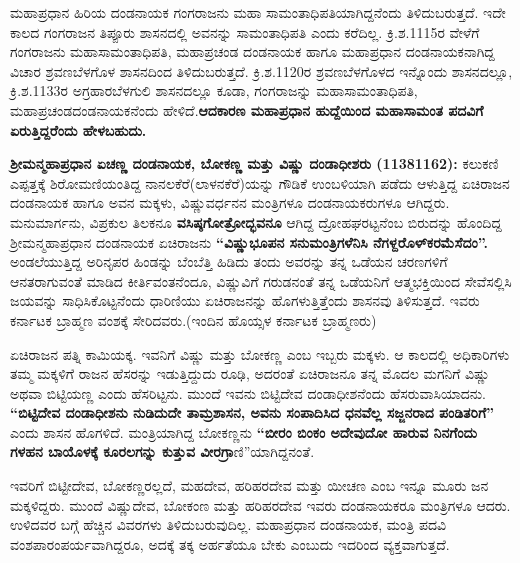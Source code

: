ಮಹಾಪ್ರಧಾನ ಹಿರಿಯ ದಂಡನಾಯಕ ಗಂಗರಾಜನು ಮಹಾ ಸಾಮಂತಾಧಿಪತಿಯಾಗಿದ್ದನೆಂದು ತಿಳಿದುಬರುತ್ತದೆ. ಇದೇ ಕಾಲದ ಗಂಗರಾಜನ ತಿಪ್ಪೂರು ಶಾಸನದಲ್ಲಿ ಅವನನ್ನು ಸಾಮಂತಾಧಿಪತಿ ಎಂದು ಕರೆದಿಲ್ಲ. ಕ್ರಿ.ಶ.1115ರ ವೇಳೆಗೆ ಗಂಗರಾಜನು ಮಹಾಸಾಮಂತಾಧಿಪತಿ, ಮಹಾಪ್ರಚಂಡ ದಂಡನಾಯಕ ಹಾಗೂ ಮಹಾಪ್ರಧಾನ ದಂಡನಾಯಕನಾಗಿದ್ದ ವಿಚಾರ ಶ್ರವಣಬೆಳಗೊಳ ಶಾಸನದಿಂದ ತಿಳಿದುಬರುತ್ತದೆ. ಕ್ರಿ.ಶ.1120ರ ಶ್ರವಣಬೆಳಗೊಳದ ಇನ್ನೊಂದು ಶಾಸನದಲ್ಲೂ, ಕ್ರಿ.ಶ.1133ರ ಅಗ್ರಹಾರಬೆಳಗುಲಿ ಶಾಸನದಲ್ಲೂ ಕೂಡಾ, ಗಂಗರಾಜನ್ನು ಮಹಾಸಾಮಂತಾಧಿಪತಿ, ಮಹಾಪ್ರಚಂಡ\break ದಂಡನಾಯಕನೆಂದು ಹೇಳಿದೆ.\textbf{ಆದಕಾರಣ ಮಹಾಪ್ರಧಾನ ಹುದ್ದೆಯಿಂದ ಮಹಾಸಾಮಂತ ಪದವಿಗೆ ಏರುತ್ತಿದ್ದರೆಂದು ಹೇಳಬಹುದು.}

\textbf{ಶ‍್ರೀಮನ್ಮಹಾಪ್ರಧಾನ ಏಚಣ್ಣ ದಂಡನಾಯಕ, ಬೋಕಣ್ಣ ಮತ್ತು ವಿಷ್ಣು ದಂಡಾಧೀಶರು (1138\general{\enginline{-}}1162):} ಕಲುಕಣಿ ಎಪ್ಪತ್ತಕ್ಕೆ ಶಿರೋಮಣಿಯಂತಿದ್ದ ನಾನಲಕೆರೆ(ಲಾಳನಕೆರೆ)ಯನ್ನು ಗೌಡಿಕೆ ಉಂಬಳಿಯಾಗಿ ಪಡೆದು ಆಳುತ್ತಿದ್ದ ಏಚಿರಾಜನ ದಂಡನಾಯಕ ಹಾಗೂ ಅವನ ಮಕ್ಕಳು, ವಿಷ್ಣುವರ್ಧನನ ಮಂತ್ರಿಗಳೂ ದಂಡನಾಯಕರುಗಳೂ ಆಗಿದ್ದರು. ಮನುಮಾರ್ಗನು, ವಿಪ್ರಕುಲ ತಿಲಕನೂ \textbf{ವಸಿಷ್ಠಗೋತ್ರೋದ್ಭವನೂ} ಆಗಿದ್ದ ದ್ರೋಹಘರಟ್ಟನೆಂಬ ಬಿರುದನ್ನು ಹೊಂದಿದ್ದ ಶ‍್ರೀಮನ್ಮಹಾಪ್ರಧಾನ ದಂಡನಾಯಕ ಏಚಿರಾಜನು \textbf{“ವಿಷ್ಣುಭೂಪನ ಸನುಮಂತ್ರಿಗಳೆನಿಸಿ ನೆಗಳ್ದರೊಳ್​ ಕರಮೆಸೆದಂ”. } ಅಂಡಲೆಯುತ್ತಿದ್ದ ಅರಿನೃಪರ ಹಿಂಡನ್ನು ಬೆಂಬೆತ್ತಿ ಹಿಡಿದು ತಂದು ಅವರನ್ನು ತನ್ನ ಒಡೆಯನ ಚರಣಗಳಿಗೆ ಆನತರಾಗುವಂತೆ ಮಾಡಿದ ಕೀರ್ತಿವಂತನೆಂದೂ, ವಿಷ್ಣುವಿಗೆ ಗರುಡನಂತೆ ತನ್ನ ಒಡೆಯನಿಗೆ ಆತ್ಮಭಕ್ತಿಯಿಂದ ಸೇವೆಸಲ್ಲಿಸಿ ಜಯವನ್ನು ಸಾಧಿಸಿಕೊಟ್ಟನೆಂದು ಧಾರಿಣಿಯು ಏಚಿರಾಜನನ್ನು ಹೊಗಳುತ್ತಿತ್ತೆಂದು ಶಾಸನವು ತಿಳಿಸುತ್ತದೆ. ಇವರು ಕರ್ನಾಟಕ ಬ್ರಾಹ್ಮಣ ವಂಶಕ್ಕೆ ಸೇರಿದವರು.(ಇಂದಿನ ಹೊಯ್ಸಳ ಕರ್ನಾಟಕ ಬ್ರಾಹ್ಮಣರು)

ಏಚಿರಾಜನ ಪತ್ನಿ ಕಾಮಿಯಕ್ಕ. ಇವನಿಗೆ ವಿಷ್ಣು ಮತ್ತು ಬೋಕಣ್ಣ ಎಂಬ ಇಬ್ಬರು ಮಕ್ಕಳು. ಆ ಕಾಲದಲ್ಲಿ ಅಧಿಕಾರಿಗಳು ತಮ್ಮ ಮಕ್ಕಳಿಗೆ ರಾಜನ ಹೆಸರನ್ನು ಇಡುತ್ತಿದ್ದುದು ರೂಢಿ, ಅದರಂತೆ ಏಚಿರಾಜನೂ ತನ್ನ ಮೊದಲ ಮಗನಿಗೆ ವಿಷ್ಣು ಅಥವಾ ಬಿಟ್ಟಿಯಣ್ಣ ಎಂದು ಹೆಸರಿಟ್ಟನು. ಮುಂದೆ ಇವನು ಬಿಟ್ಟಿದೇವ ದಂಡಾಧೀಶನೆಂದು ಹೆಸರುವಾಸಿಯಾದನು. \textbf{“ಬಿಟ್ಟಿದೇವ ದಂಡಾಧೀಶನು ನುಡಿದುದೇ ತಾಮ್ರಶಾಸನ, ಅವನು ಸಂಪಾದಿಸಿದ ಧನವೆಲ್ಲ ಸಜ್ಜನರಾದ ಪಂಡಿತರಿಗೆ”} ಎಂದು ಶಾಸನ ಹೊಗಳಿದೆ. ಮಂತ್ರಿಯಾಗಿದ್ದ ಬೋಕಣ್ಣನು \textbf{“ಬೀರಂ ಬಿಂಕಂ ಅದೇವುದೋ ಹಾರುವ ನಿನಗೆಂದು ಗಳಹನ ಬಾಯೊಳಕ್ಕೆ ಕೂರಲಗನ್ನು ಕುತ್ತುವ ವೀರಗ್ರಾ}ಣಿ”ಯಾಗಿದ್ದನಂತೆ.

ಇವರಿಗೆ ಬಿಟ್ಟೀದೇವ, ಬೋಕಣ್ಣರಲ್ಲದೆ, ಮಹದೇವ, ಹರಿಹರದೇವ ಮತ್ತು ಯೀಚಣ ಎಂಬ ಇನ್ನೂ ಮೂರು ಜನ ಮಕ್ಕಳಿದ್ದರು. ಮುಂದೆ ವಿಷ್ಣುದೇವ, ಬೋಕಂಣ ಮತ್ತು ಹರಿಹರದೇವ ಇವರು ದಂಡನಾಯಕರೂ ಮಂತ್ರಿಗಳೂ ಆದರು. ಉಳಿದವರ ಬಗ್ಗೆ ಹೆಚ್ಚಿನ ವಿವರಗಳು ತಿಳಿದುಬರುವುದಿಲ್ಲ. ಮಹಾಪ್ರಧಾನ ದಂಡನಾಯಕ, ಮಂತ್ರಿ ಪದವಿ ವಂಶಪಾರಂಪರ್ಯವಾಗಿದ್ದರೂ, ಅದಕ್ಕೆ ತಕ್ಕ ಅರ್ಹತೆಯೂ ಬೇಕು ಎಂಬುದು ಇದರಿಂದ ವ್ಯಕ್ತವಾಗುತ್ತದೆ.

